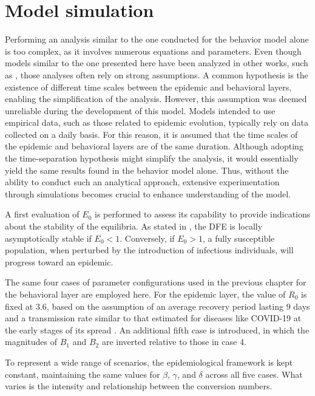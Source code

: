 \section{Model simulation}
Performing an analysis similar to the one conducted for the behavior model alone is too complex, as it involves numerous equations and parameters. Even though models similar to the one presented here have been analyzed in other works, such as \cite{Bulai2023}, those analyses often rely on strong assumptions. A common hypothesis is the existence of different time scales between the epidemic and behavioral layers, enabling the simplification of the analysis. However, this assumption was deemed unreliable during the development of this model. Models intended to use empirical data, such as those related to epidemic evolution, typically rely on data collected on a daily basis. For this reason, it is assumed that the time scales of the epidemic and behavioral layers are of the same duration. Although adopting the time-separation hypothesis might simplify the analysis, it would essentially yield the same results found in the behavior model alone. Thus, without the ability to conduct such an analytical approach, extensive experimentation through simulations becomes crucial to enhance understanding of the model.

A first evaluation of $E_0$ is performed to assess its capability to provide indications about the stability of the equilibria. As stated in \cite{van_den_Driessche_2002,van_den_Driessche_2017}, the DFE is locally asymptotically stable if $E_0 < 1$. Conversely, if $E_0 > 1$, a fully susceptible population, when perturbed by the introduction of infectious individuals, will progress toward an epidemic.

The same four cases of parameter configurations used in the previous chapter for the behavioral layer are employed here. For the epidemic layer, the value of $R_0$ is fixed at $3.6$, based on the assumption of an average recovery period lasting $9$ days and a transmission rate similar to that estimated for diseases like COVID-19 at the early stages of its spread \cite{data_R0_covid}. An additional fifth case is introduced, in which the magnitudes of $B_1$ and $B_2$ are inverted relative to those in case 4.

To represent a wide range of scenarios, the epidemiological framework is kept constant, maintaining the same values for $\beta$, $\gamma$, and $\delta$ across all five cases. What varies is the intensity and relationship between the conversion numbers.

